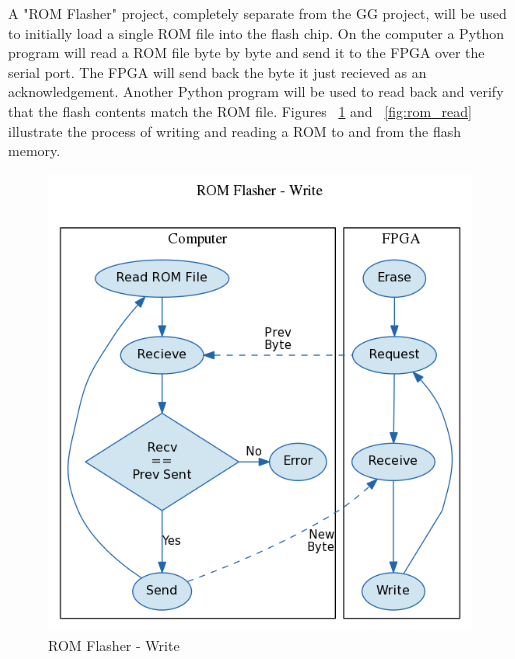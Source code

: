 \documentclass{article}
\begin{document}
A "ROM Flasher" project, completely separate from the GG project,
will be used to initially load a single ROM file into the flash chip.
On the computer a Python program will read a ROM file byte by byte
and send it to the FPGA over the serial port. The FPGA will send back
the byte it just recieved as an acknowledgement. Another
Python program will be used to read back and verify that the flash contents
match the ROM file. Figures ~\ref{fig:rom_write} and ~\ref{fig:rom_read} 
illustrate the process of writing and reading a ROM to and from the
flash memory.

\begin{figure}[H]
    \centering
    \begin{minipage}[H]{0.45\linewidth}
        \centering
        \includegraphics[width=\textwidth]{../../fpga/rom_flasher/doc/block_diagram_write.png}
        \caption{ROM Flasher - Write}
        \label{fig:rom_write}
    \end{minipage}
    \hspace{0.5cm}
    \begin{minipage}[H]{0.45\linewidth}
        \centering

\end{minipage}
\end{figure}
\end{document}
